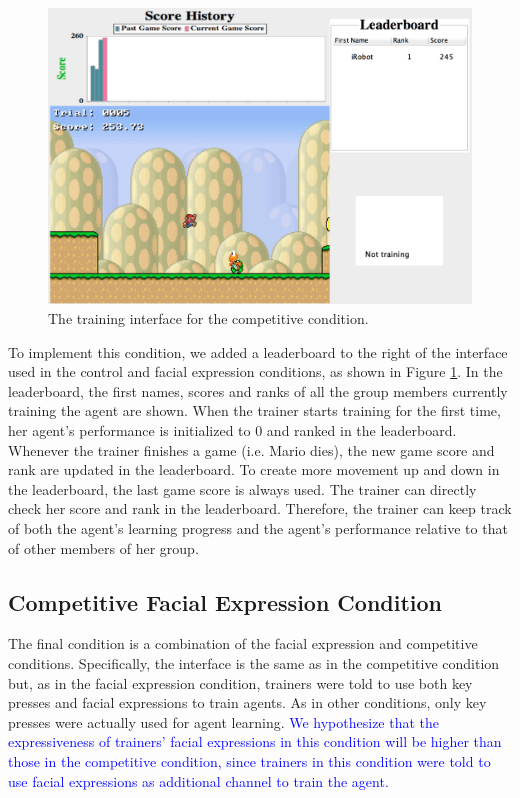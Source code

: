 \begin{figure}[htb]
\centering
\includegraphics[width=0.55\linewidth]{leaderboard}
\caption{The training interface for the competitive condition.}
\label{leaderboard}
\end{figure}

To implement this condition, we added a leaderboard to the right of the interface used in the control and facial expression conditions, as shown in Figure \ref{leaderboard}. 
In the leaderboard, the first names, scores and ranks of all the group members currently training the agent are shown. When the trainer starts training for the first time, her agent's performance is initialized to 0 and ranked in the leaderboard. Whenever the trainer finishes a game (i.e. Mario dies), the new game score and rank are updated in the leaderboard. To create more movement up and down in the leaderboard, the last game score is always used. The trainer can directly check her score and rank in the leaderboard. Therefore, the trainer can keep track of both the agent's learning progress and the agent's performance relative to that of other members of her group.


\subsection{Competitive Facial Expression Condition}%
The final condition is a combination of the facial expression and competitive conditions. Specifically, the interface is the same as in the competitive condition but, as in the facial expression condition, trainers were told to use both key presses and facial expressions to train agents.  As in other conditions, only key presses were actually used for agent learning. \textcolor{blue}{We hypothesize that the expressiveness of trainers' facial expressions in this condition will be %
higher than those in the %
competitive condition, since trainers in this condition were %
told to use facial expressions as additional channel to train the agent. %
}

